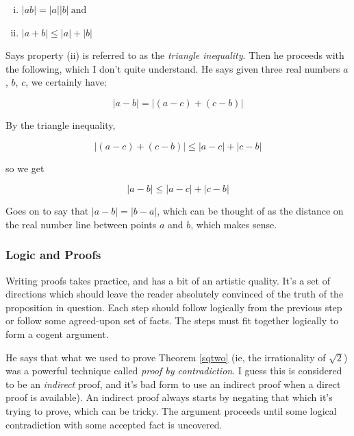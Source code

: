 \documentclass{article}
\numberwithin{equation}{subsection}
\numberwithin{theo}{subsection}
\begin{document}
\begin{enumerate}[(i)]
    \item $\lvert ab \rvert = \lvert a \rvert \lvert b \rvert ~ \text{and} $
    \item $\lvert a + b \rvert \leq \lvert a \rvert + \lvert b \rvert$
\end{enumerate}

Says property (ii) is referred to as the \emph{triangle inequality}. Then he
proceeds with the following, which I don't quite understand. He says given three
real numbers $a$, $b$, $c$, we certainly have:

\begin{equation*}
    \lvert a-b \rvert = \lvert (a-c) + (c-b) \rvert
\end{equation*}

By the triangle inequality,

\begin{equation*}
    \lvert (a-c) + (c-b) \rvert \leq \lvert a-c \rvert + \lvert c-b \rvert
\end{equation*}

so we get

\begin{equation*}
    \lvert a-b \rvert \leq \lvert a-c \rvert + \lvert c-b \rvert
\end{equation*}

Goes on to say that $\lvert a-b \rvert = \lvert b-a \rvert$, which can be
thought of as the distance on the real number line between points $a$ and $b$,
which makes sense.

\subsubsection*{Logic and Proofs}

Writing proofs takes practice, and has a bit of an artistic quality. It's a set
of directions which should leave the reader absolutely convinced of the truth of
the proposition in question. Each step should follow logically from the previous
step or follow some agreed-upon set of facts. The steps must fit together
logically to form a cogent argument. 

He says that what we used to prove Theorem \ref{sqtwo} (ie, the irrationality
of $\sqrt{2}$) was a powerful technique called \emph{proof by contradiction}.
I guess this is considered to be an \emph{indirect} proof, and it's bad form to
use an indirect proof when a direct proof is available). An indirect proof
always starts by negating that which it's trying to prove, which can be tricky.
The argument proceeds until some logical contradiction with some accepted fact
is uncovered. 
\end{document}
